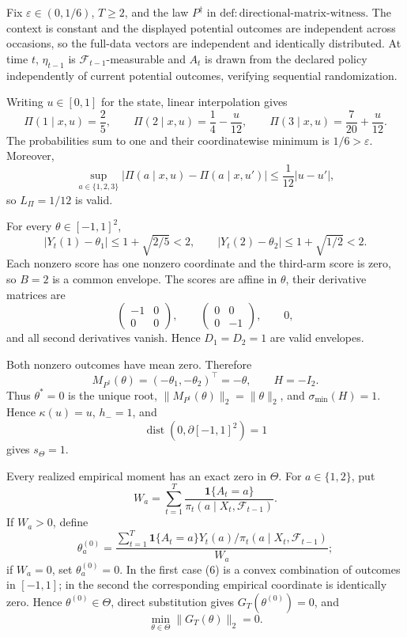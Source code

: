 Fix \(\varepsilon\in(0,1/6)\), \(T\ge2\), and the law \(P^\dagger\) in \(\mathrm{def:directional\text{-}matrix\text{-}witness}\). The context is constant and the displayed potential outcomes are independent across occasions, so the full-data vectors are independent and identically distributed. At time \(t\), \(\eta_{t-1}\) is \(\mathcal F_{t-1}\)-measurable and \(A_t\) is drawn from the declared policy independently of current potential outcomes, verifying sequential randomization.

Writing \(u\in[0,1]\) for the state, linear interpolation gives
\[
 \Pi(1\mid x,u)=\frac25,\qquad
 \Pi(2\mid x,u)=\frac14-\frac{u}{12},\qquad
 \Pi(3\mid x,u)=\frac7{20}+\frac{u}{12}.
\tag{1}
\]
The probabilities sum to one and their coordinatewise minimum is \(1/6>\varepsilon\). Moreover,
\[
 \sup_{a\in\{1,2,3\}}|\Pi(a\mid x,u)-\Pi(a\mid x,u')|
 \le\frac1{12}|u-u'|,
\tag{2}
\]
so \(L_\Pi=1/12\) is valid.

For every \(\theta\in[-1,1]^2\),
\[
 |Y_t(1)-\theta_1|\le1+\sqrt{2/5}<2,
 \qquad |Y_t(2)-\theta_2|\le1+\sqrt{1/2}<2.
\tag{3}
\]
Each nonzero score has one nonzero coordinate and the third-arm score is zero, so \(B=2\) is a common envelope. The scores are affine in \(\theta\), their derivative matrices are
\[
 \begin{pmatrix}-1&0\\0&0\end{pmatrix},\qquad
 \begin{pmatrix}0&0\\0&-1\end{pmatrix},\qquad 0,
\]
and all second derivatives vanish. Hence \(D_1=D_2=1\) are valid envelopes.

Both nonzero outcomes have mean zero. Therefore
\[
 M_{P^\dagger}(\theta)=(-\theta_1,-\theta_2)^\top=-\theta,
 \qquad H=-I_2.
\tag{4}
\]
Thus \(\theta^*=0\) is the unique root, \(\|M_{P^\dagger}(\theta)\|_2=\|\theta\|_2\), and \(\sigma_{\min}(H)=1\). Hence \(\kappa(u)=u\), \(h_-=1\), and
\[
 \operatorname{dist}(0,\partial[-1,1]^2)=1
\tag{5}
\]
gives \(s_\Theta=1\).

Every realized empirical moment has an exact zero in \(\Theta\). For \(a\in\{1,2\}\), put
\[
 W_a=\sum_{t=1}^T\frac{\mathbf1\{A_t=a\}}
 {\pi_t(a\mid X_t,\mathcal F_{t-1})}.
\]
If \(W_a>0\), define
\[
 \theta_a^{(0)}=
 \frac{\sum_{t=1}^T\mathbf1\{A_t=a\}Y_t(a)/
 \pi_t(a\mid X_t,\mathcal F_{t-1})}{W_a};
\tag{6}
\]
if \(W_a=0\), set \(\theta_a^{(0)}=0\). In the first case (6) is a convex combination of outcomes in \([-1,1]\); in the second the corresponding empirical coordinate is identically zero. Hence \(\theta^{(0)}\in\Theta\), direct substitution gives \(G_T(\theta^{(0)})=0\), and
\[
 \min_{\theta\in\Theta}\|G_T(\theta)\|_2=0.
\tag{7}
\]


